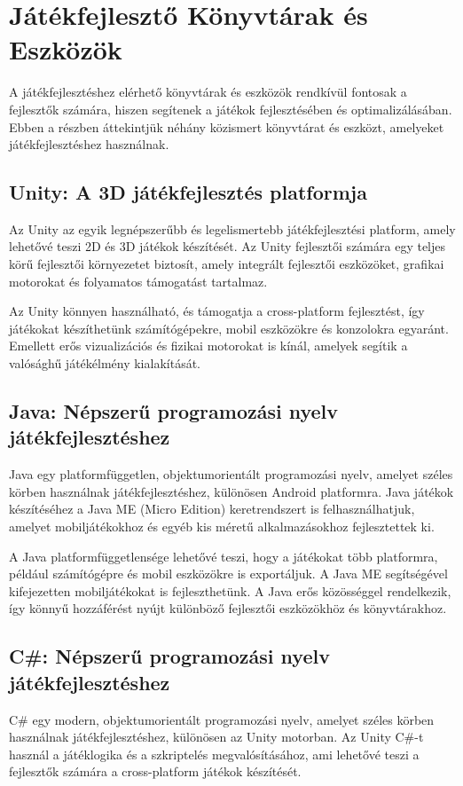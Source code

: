 \section{Játékfejlesztő Könyvtárak és Eszközök}

A játékfejlesztéshez elérhető könyvtárak és eszközök rendkívül fontosak a fejlesztők számára, hiszen segítenek a játékok fejlesztésében és optimalizálásában. Ebben a részben áttekintjük néhány közismert könyvtárat és eszközt, amelyeket játékfejlesztéshez használnak.

\subsection{Unity: A 3D játékfejlesztés platformja}\cite{unity-doc}
Az Unity az egyik legnépszerűbb és legelismertebb játékfejlesztési platform, amely lehetővé teszi 2D és 3D játékok készítését. Az Unity fejlesztői számára egy teljes körű fejlesztői környezetet biztosít, amely integrált fejlesztői eszközöket, grafikai motorokat és folyamatos támogatást tartalmaz.

Az Unity könnyen használható, és támogatja a cross-platform fejlesztést, így játékokat készíthetünk számítógépekre, mobil eszközökre és konzolokra egyaránt. Emellett erős vizualizációs és fizikai motorokat is kínál, amelyek segítik a valósághű játékélmény kialakítását.

\subsection{Java: Népszerű programozási nyelv játékfejlesztéshez}\cite{java-doc}
Java egy platformfüggetlen, objektumorientált programozási nyelv, amelyet széles körben használnak játékfejlesztéshez, különösen Android platformra. Java játékok készítéséhez a Java ME (Micro Edition) keretrendszert is felhasználhatjuk, amelyet mobiljátékokhoz és egyéb kis méretű alkalmazásokhoz fejlesztettek ki.

A Java platformfüggetlensége lehetővé teszi, hogy a játékokat több platformra, például számítógépre és mobil eszközökre is exportáljuk. A Java ME segítségével kifejezetten mobiljátékokat is fejleszthetünk. A Java erős közösséggel rendelkezik, így könnyű hozzáférést nyújt különböző fejlesztői eszközökhöz és könyvtárakhoz.

\subsection{C\#: Népszerű programozási nyelv játékfejlesztéshez}
C\# egy modern, objektumorientált programozási nyelv, amelyet széles körben használnak játékfejlesztéshez, különösen az Unity motorban. Az Unity C\#-t használ a játéklogika és a szkriptelés megvalósításához, ami lehetővé teszi a fejlesztők számára a cross-platform játékok készítését.

